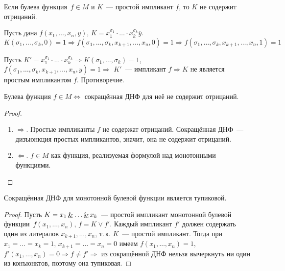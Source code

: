 \begin{theorem}
Если булева функция~$f \in M$ и $K$~--- простой импликант $f$, то $K$ не содержит отрицаний.
\end{theorem}
\begin{proofcontra}
Пусть дана $f(x_1, \ldots, x_n, y)$, $K = x_1^{\sigma_1} \cdot \ldots \cdot x_k^{\sigma_k} \overline y$.
\begin{equation*}
K(\sigma_1, \ldots, \sigma_k, 0) = 1 \Rightarrow
f(\sigma_1, \ldots, \sigma_k, x_{k+1}, \ldots, x_n, 0) = 1 \Rightarrow
f(\sigma_1, \ldots, \sigma_k, x_{k+1}, \ldots, x_n, 1) = 1
\end{equation*}

Пусть $K' = x_1^{\sigma_1} \cdot \ldots \cdot x_k^{\sigma_k} \Rightarrow
K(\sigma_1, \ldots, \sigma_k) = 1$, $f(\sigma_1, \ldots, \sigma_k, x_{k+1}, \ldots, x_n, y) = 1 \Rightarrow$ $K'$~--- импликант $f \Rightarrow K$ не является простым импликантом $f$.
Противоречие.
\end{proofcontra}

\begin{theorem}
Булева функция $f \in M \Leftrightarrow$ сокращённая ДНФ для неё не содержит отрицаний.
\end{theorem}
\begin{proof}
\begin{enumerate}
	\item $\Rightarrow$. Простые импликанты $f$ не содержат отрицаний.
	Сокращённая ДНФ~--- дизъюнкция простых импликантов, значит, она не содержит отрицаний.
	\item $\Leftarrow$. $f \in M$ как функция, реализуемая формулой над монотонными функциями.
\end{enumerate}
\end{proof}

\begin{theorem}
Сокращённая ДНФ для монотонной булевой функции является тупиковой.
\end{theorem}
\begin{proof}
Пусть $K = x_1 \mathop{\&} \ldots \mathop{\&} x_k$~--- простой импликант монотонной булевой функции~$f(x_1, \ldots, x_n)$, $f = K \lor f'$.
Каждый импликант $f'$ должен содержать один из литералов $x_{k+1}, \ldots, x_n$, т.\,к. $K$~--- простой импликант.
Тогда при $x_1 = \ldots = x_k = 1$, $x_{k+1} = \ldots = x_n = 0$ имеем $f(x_1, \ldots, x_n) = 1$, $f'(x_1, \ldots, x_n) = 0 \Rightarrow f \neq f' \Rightarrow$ из сокращённой ДНФ нельзя вычеркнуть ни один из конъюнктов, поэтому она тупиковая.
\end{proof}

